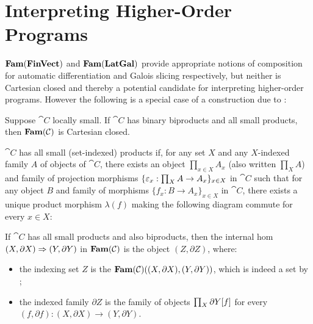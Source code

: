 \section{Interpreting Higher-Order Programs}
\label{sec:higher-order}

$\mathbf{Fam}(\mathbf{FinVect})$ and $\mathbf{Fam}(\mathbf{LatGal})$ provide appropriate notions of composition for automatic differentiation
and Galois slicing respectively, but neither is Cartesian closed and thereby a potential candidate for
interpreting higher-order programs. However the following is a special case of a construction due to
\citet{nunes2023}:

\begin{proposition}
Suppose $\cat{C}$ locally small. If $\cat{C}$ has binary biproducts and all small products, then
$\mathbf{Fam}(\mathcal{C})$ is Cartesian closed.
\end{proposition}

$\cat{C}$ has all small (set-indexed) products if, for any set $X$ and any $X$-indexed family $A$ of objects
of $\cat{C}$, there exists an object $\prod_{x \in X}A_x$ (also written $\prod_{X} A$) and family of
projection morphisms $\{\varepsilon_x: \prod_{X} A \to A_x\}_{x \in X}$ in $\cat{C}$ such that for any object $B$
and family of morphisms $\{f_x: B \to A_x\}_{x \in X}$ in $\cat{C}$, there exists a unique product morphism
$\lambda(f)$ making the following diagram commute for every $x \in X$:

\begin{center}
\end{center}

If $\cat{C}$ has all small products and also biproducts, then the internal hom $(X, \partial
X) \Rightarrow (Y, \partial Y)$ in $\mathbf{Fam}(\mathcal{C})$ is the object $(Z, \partial Z)$, where:
\begin{itemize}
\item the indexing set $Z$ is the $\mathbf{Fam}(\mathcal{C})((X, \partial X), (Y, \partial Y))$, which is indeed a set by
;
\item the indexed family $\partial Z$ is the family of objects $\prod_{X}\partial Y[f]$ for every
${(f, \partial f): (X, \partial X) \to (Y, \partial Y)}$.
\end{itemize}

